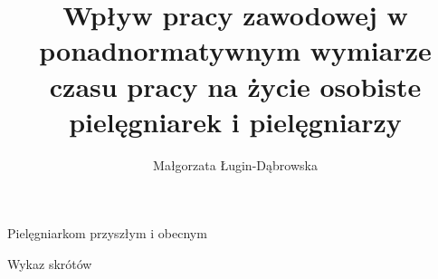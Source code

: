 \documentclass[a4paper,12pt,twoside,openright]{mwrep}
\title{Wpływ pracy zawodowej w ponadnormatywnym wymiarze czasu pracy na życie osobiste pielęgniarek i pielęgniarzy}
\author{Małgorzata Ługin-Dąbrowska}
\newcommand{\nocontentsline}[3]{}
\newcommand{\tocless}[2]{\bgroup\let\addcontentsline=\nocontentsline#1{#2}\egroup}
\begin{document}
\sloppy
\maketitle

\newpage

\centerline{Pielęgniarkom przyszłym i obecnym}

\tableofcontents


\newpage
\Large Wykaz skrótów
\normalsize

\end{document}
